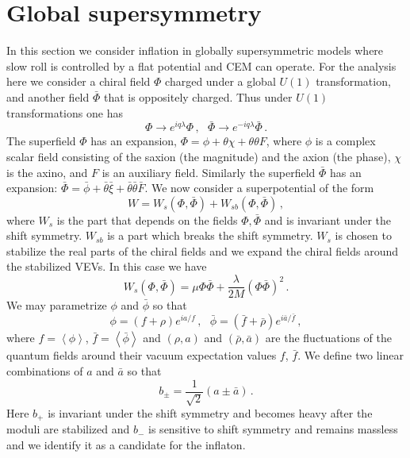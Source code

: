 \documentclass[12pt]{article}
\begin{document}
\section{Global supersymmetry \label{sec:Supersymmetry}}
In this section we consider inflation in globally supersymmetric models where slow roll  is controlled by a flat potential and CEM can operate.
For the analysis here we consider a chiral field $\Phi$ charged under a global $U\left(1\right)$ transformation, and another field $\bar\Phi$ that is oppositely charged.
Thus under $U\left(1\right)$ transformations one has
\begin{equation}
  \Phi \to e^{i q \lambda} \Phi\,,
  ~~~ \bar\Phi \to e^{-i q \lambda} \bar\Phi\,.
\end{equation}
The superfield $\Phi$ has an expansion, $\Phi = \phi + \theta \chi + \theta \theta F$, where $\phi$ is a complex scalar field consisting of the saxion (the magnitude) and the axion (the phase), $\chi$ is the axino, and $F$ is an auxiliary field.
Similarly the superfield $\bar\Phi$ has an expansion: $\bar\Phi = \bar\phi + \bar\theta \bar\xi + \bar\theta \bar\theta \bar F$.
We now consider a superpotential of the form
\begin{equation} \label{eq:supersymmetry:W}
  W = W_s\left(\Phi, \bar\Phi\right) + W_{sb}\left(\Phi, \bar\Phi\right)\,,
\end{equation}
where $W_s$ is the part that depends on the fields $\Phi, \bar\Phi$ and is invariant under the shift symmetry.
$W_{sb}$ is a part which breaks the shift symmetry.
$W_s$ is chosen to stabilize the real parts of the chiral fields and we expand the chiral fields around the stabilized VEVs.
In this case we have
\begin{equation}
  W_s\left(\Phi, \bar\Phi\right) =
    \mu \Phi \bar\Phi + \frac{\lambda}{2 M} \left(\Phi \bar\Phi\right)^2\,.
\end{equation}
We may parametrize $\phi$ and $\bar\phi$ so that
\begin{equation}
  \phi = \left(f + \rho\right) e^{i a / f}\,,
  ~~~ \bar\phi = \left(\bar f + \bar\rho\right) e^{i \bar a / \bar f}\,,
\end{equation}
where $f = \left<\phi\right>$, $\bar f = \left<\bar\phi\right>$ and $\left(\rho, a\right)$ and $\left(\bar\rho, \bar a\right)$ are the fluctuations of the quantum fields around their vacuum expectation values $f$, $\bar f$.
We define two linear combinations of $a$ and $\bar a$ so that
\begin{equation} \label{eq:b+-}
  b_{\pm}= \frac{1}{\sqrt 2} \left(a \pm \bar a\right)\,.
\end{equation}
Here $b_+$ is invariant under the shift symmetry and becomes heavy after the moduli are stabilized and $b_-$ is sensitive to shift symmetry and remains massless and we identify it as a candidate for the inflaton.
\end{document}
